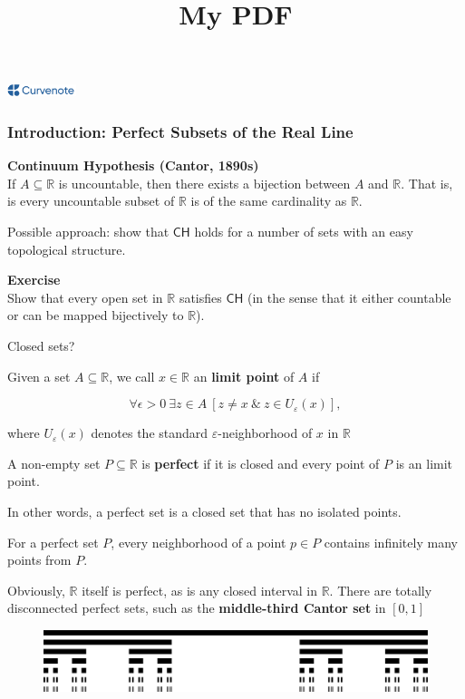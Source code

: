 \documentclass{article}
\title{My PDF}
\author{}
\date{\displaydate{articleDate}}
\newcommand{\Real}{\mathbb{R}}
\newcommand{\R}{\mathbb{R}}
\newcommand{\CH}{\mathsf{CH}}
\newcommand{\eps}{\varepsilon}
\newcommand{\logo}{
  \href{https://curvenote.com}{\includegraphics[width=2cm]{curvenote.png}}
}
\begin{document}
\maketitle
\begin{center}\logo\end{center}


\begin{frame}
\frametitle{Introduction: Perfect Subsets of the Real Line}

\begin{framed}
\textbf{Continuum Hypothesis (Cantor, 1890s)}\\
If $A \subseteq \Real$ is uncountable, then there exists a bijection between $A$ and $\Real$. That is, is every uncountable subset of $\Real$ is of the same cardinality as $\Real$.
\end{framed}

Possible approach: show that $\CH$ holds for a number of sets with an easy topological structure.

\begin{framed}
\textbf{Exercise}\\
Show that every open set in $\R$ satisfies $\CH$ (in the sense that it either countable or can be mapped bijectively to $\R$).
\end{framed}

Closed sets?

Given a set $A \subseteq \Real$, we call $x \in \Real$ an \textbf{limit point} of $A$ if

\begin{equation}
\forall \epsilon > 0 \: \exists z \in A \: [z \neq x \: \& \: z \in U_\eps(x)],
\end{equation}

where $U_\eps(x)$ denotes the standard $\eps$-neighborhood of $x$ in $\Real$

A non-empty set $P \subseteq \Real$ is \textbf{perfect} if it is closed and every point of $P$ is an limit point.

In other words, a perfect set is a closed set that has no isolated points.

For a perfect set $P$, every neighborhood of a point $p \in P$ contains infinitely many points from $P$.

Obviously, $\Real$ itself is perfect, as is any closed interval in $\Real$. There are totally disconnected perfect sets, such as the \textbf{middle-third Cantor set} in $[0,1]$

\begin{figure}[!htbp]
\centering
\includegraphics[width=0.7\linewidth]{files/Cantor_set-7f15a3eb647d25cf38092c5cd78d7432.png}
\end{figure}


\end{frame}
\end{document}
